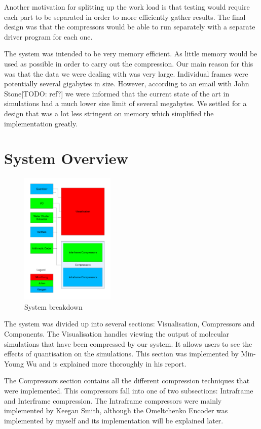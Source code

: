 \documentclass[a4paper,11pt]{report}
\begin{document}
Another motivation for splitting up the work load is that testing would require each part to be separated in order to more efficiently gather results. The final design was that the compressors would be able to run separately with a separate driver program for each one.

The system was intended to be very memory efficient. As little memory would be used as possible in order to carry out the compression. Our main reason for this was that the data we were dealing with was very large. Individual frames were potentially several gigabytes in size. However, according to an email with John Stone[TODO: ref?] we were informed that the current state of the art in simulations had a much lower size limit of several megabytes. We settled for a design that was a lot less stringent on memory which simplified the implementation greatly.


\section{System Overview}

\begin{figure}
 \center
 \includegraphics[width=0.4\textwidth]{resources/Breakdown-connect.pdf}
\caption{System breakdown}
\label{sysbreak}
\end{figure}

The system was divided up into several sections: Visualisation, Compressors and Components. The Visualisation handles viewing the output of molecular simulations that have been compressed by our system. It allows users to see the effects of quantisation on the simulations. This section was implemented by Min-Young Wu and is explained more thoroughly in his report. 

The Compressors section contains all the different compression techniques that were implemented. This compressors fall into one of two subsections: Intraframe and Interframe compression. The Intraframe compressors were mainly implemented by Keegan Smith, although the Omeltchenko Encoder was implemented by myself and its implementation will be explained later.
\end{document}

